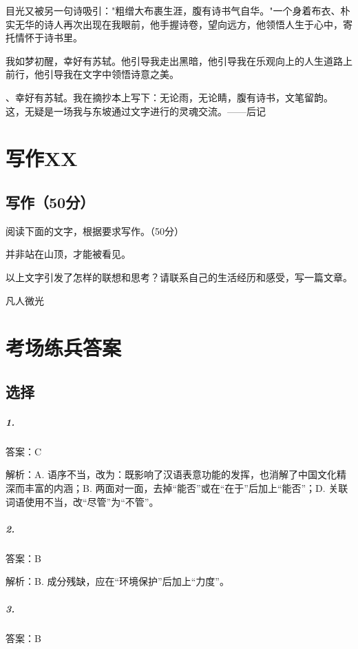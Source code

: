目光又被另一句诗吸引："粗缯大布裹生涯，腹有诗书气自华。"一个身着布衣、朴实无华的诗人再次出现在我眼前，他手握诗卷，望向远方，他领悟人生于心中，寄托情怀于诗书里。

我如梦初醒，幸好有苏轼。他引导我走出黑暗，他引导我在乐观向上的人生道路上前行，他引导我在文字中领悟诗意之美。

、幸好有苏轼。我在摘抄本上写下：无论雨，无论睛，腹有诗书，文笔留韵。
这，无疑是一场我与东坡通过文字进行的灵魂交流。——后记


\chapter{写作XX}


\section{写作（50分）}

阅读下面的文字，根据要求写作。（50分）

并非站在山顶，才能被看见。

以上文字引发了怎样的联想和思考？请联系自己的生活经历和感受，写一篇文章。


凡人微光

\chapter{考场练兵答案}

\section{选择}

\paragraph{1.} 答案：C

解析：A. 语序不当，改为：既影响了汉语表意功能的发挥，也消解了中国文化精深而丰富的内涵；B. 两面对一面，去掉“能否”或在“在于”后加上“能否”；D. 关联词语使用不当，改“尽管”为“不管”。

\paragraph{2.} 答案：B

解析：B. 成分残缺，应在“环境保护”后加上“力度”。

\paragraph{3.} 答案：B

